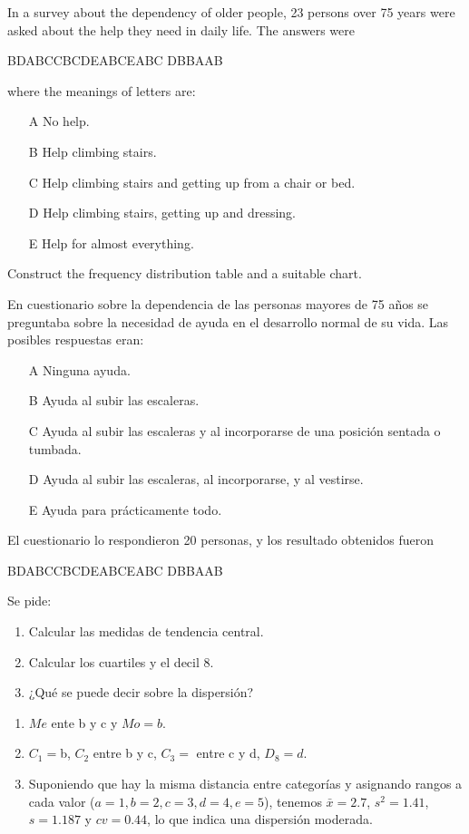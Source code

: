 {In a survey about the dependency of older people, 23 persons over 75 years were asked about the help they need in
daily life.
The answers were
\begin{center}
B\quad D\quad A\quad B\quad C\quad C\quad B\quad C\quad D\quad E\quad A\quad B\quad C\quad E\quad A\quad B\quad C\quad
D\quad B\quad B\quad A\quad A\quad B
\end{center}

where the meanings of letters are:
\begin{enumerate}
\item[A] No help.
\item[B] Help climbing stairs.
\item[C] Help climbing stairs and getting up from a chair or bed.
\item[D] Help climbing stairs, getting up and dressing.
\item[E] Help for almost everything.
\end{enumerate}

Construct the frequency distribution table and a suitable chart.
}
{
}
{}


{En cuestionario sobre la dependencia de las personas mayores de 75 años se preguntaba sobre la necesidad de ayuda en el desarrollo normal de su vida. Las posibles respuestas eran:
\begin{enumerate}
\item[A] Ninguna ayuda.
\item[B] Ayuda al subir las escaleras.
\item[C] Ayuda al subir las escaleras y al incorporarse de una posición sentada o tumbada.
\item[D] Ayuda al subir las escaleras, al incorporarse, y al vestirse.
\item[E] Ayuda para prácticamente todo.
\end{enumerate}
El cuestionario lo respondieron 20 personas, y los resultado obtenidos fueron
\begin{center}
B\quad D\quad A\quad B\quad C\quad C\quad B\quad C\quad D\quad E\quad A\quad B\quad C\quad E\quad A\quad B\quad C\quad
D\quad B\quad B\quad A\quad A\quad B
\end{center}
Se pide:
\begin{enumerate}
\item Calcular las medidas de tendencia central.
\item Calcular los cuartiles y el decil 8.
\item ¿Qué se puede decir sobre la dispersión?
\end{enumerate}
}
{\begin{enumerate}
\item $Me$ ente b y c y $Mo=b$.
\item $C_1=$b, $C_2$ entre b y c, $C_3=$ entre c y d, $D_8=d$.
\item Suponiendo que hay la misma distancia entre categorías y asignando rangos a cada valor ($a=1,b=2,c=3,d=4,e=5$), tenemos $\bar x=2.7$, $s^2=1.41$, $s=1.187$ y $cv=0.44$, lo que indica una dispersión moderada.
\end{enumerate}
}
{}


